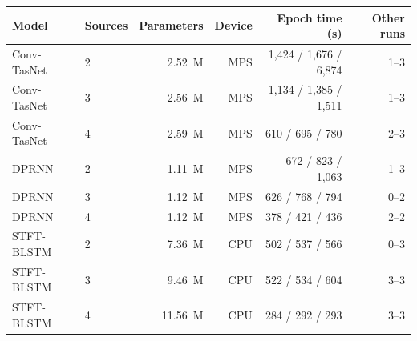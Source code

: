 \begin{tabular}{llrrrr}
\toprule
Model & Sources & Parameters & Device & Epoch time (s) & Other runs \\
\midrule
Conv-TasNet & 2 & 2.52~M & MPS & 1{,}424 / 1{,}676 / 6{,}874 & 1--3 \\
Conv-TasNet & 3 & 2.56~M & MPS & 1{,}134 / 1{,}385 / 1{,}511 & 1--3 \\
Conv-TasNet & 4 & 2.59~M & MPS & 610 / 695 / 780 & 2--3 \\
DPRNN & 2 & 1.11~M & MPS & 672 / 823 / 1{,}063 & 1--3 \\
DPRNN & 3 & 1.12~M & MPS & 626 / 768 / 794 & 0--2 \\
DPRNN & 4 & 1.12~M & MPS & 378 / 421 / 436 & 2--2 \\
STFT-BLSTM & 2 & 7.36~M & CPU & 502 / 537 / 566 & 0--3 \\
STFT-BLSTM & 3 & 9.46~M & CPU & 522 / 534 / 604 & 3--3 \\
STFT-BLSTM & 4 & 11.56~M & CPU & 284 / 292 / 293 & 3--3 \\
\bottomrule
\end{tabular}
